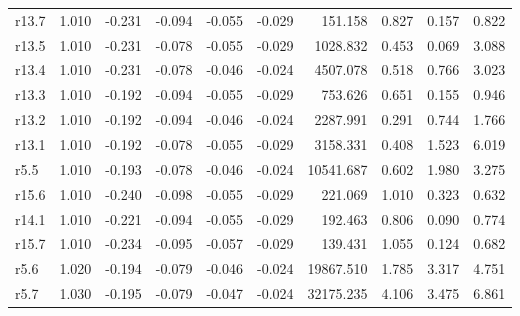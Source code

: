 \begin{longtable}{lrrrrrrrrr}
r13.7 &     1.010 &   -0.231 &   -0.094 &  -0.055 &  -0.029 &     151.158 &    0.827 &        0.157 &       0.822 \\
r13.5 &     1.010 &   -0.231 &   -0.078 &  -0.055 &  -0.029 &    1028.832 &    0.453 &        0.069 &       3.088 \\
r13.4 &     1.010 &   -0.231 &   -0.078 &  -0.046 &  -0.024 &    4507.078 &    0.518 &        0.766 &       3.023 \\
r13.3 &     1.010 &   -0.192 &   -0.094 &  -0.055 &  -0.029 &     753.626 &    0.651 &        0.155 &       0.946 \\
r13.2 &     1.010 &   -0.192 &   -0.094 &  -0.046 &  -0.024 &    2287.991 &    0.291 &        0.744 &       1.766 \\
r13.1 &     1.010 &   -0.192 &   -0.078 &  -0.055 &  -0.029 &    3158.331 &    0.408 &        1.523 &       6.019 \\
 r5.5 &     1.010 &   -0.193 &   -0.078 &  -0.046 &  -0.024 &   10541.687 &    0.602 &        1.980 &       3.275 \\
r15.6 &     1.010 &   -0.240 &   -0.098 &  -0.055 &  -0.029 &     221.069 &    1.010 &        0.323 &       0.632 \\
r14.1 &     1.010 &   -0.221 &   -0.094 &  -0.055 &  -0.029 &     192.463 &    0.806 &        0.090 &       0.774 \\
r15.7 &     1.010 &   -0.234 &   -0.095 &  -0.057 &  -0.029 &     139.431 &    1.055 &        0.124 &       0.682 \\
 r5.6 &     1.020 &   -0.194 &   -0.079 &  -0.046 &  -0.024 &   19867.510 &    1.785 &        3.317 &       4.751 \\
 r5.7 &     1.030 &   -0.195 &   -0.079 &  -0.047 &  -0.024 &   32175.235 &    4.106 &        3.475 &       6.861 \\
\end{longtable}

